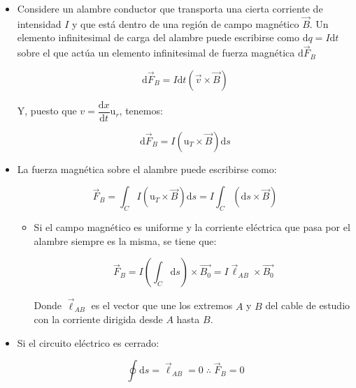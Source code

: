 \documentclass[a4paper,10pt]{article}
\begin{document}
\begin{itemize}
    
\item Considere un alambre conductor que transporta una cierta corriente
de intensidad $I$ y que está dentro de una región de campo magnético
$\vec{B}$. Un elemento infinitesimal de carga del alambre puede escribirse
como $\mathrm{d}q=I\mathrm{d}t$ sobre el que actúa un elemento
infinitesimal de fuerza magnética $\mathrm{d}\vec{F}_B$

\begin{equation*}
    \mathrm{d}\vec{F}_B=I\mathrm{d} t\left(\vec{v}\times\vec{B}\right)
\end{equation*}

Y, puesto que $v=\dfrac{\mathrm{d}x}{\mathrm{d}t}\mathrm{u}_r$, tenemos:

\begin{equation*}
    \mathrm{d}\vec{F}_B=I\left(\mathrm{u}_T\times\vec{B}\right)\mathrm{d}s
\end{equation*}

\item La fuerza magnética sobre el alambre puede escribirse como:

\begin{equation*}
    \boxed{
    \vec{F}_B=\int_C I\left(\mathrm{u}_T\times\vec{B}\right)\mathrm{d}s
    =I\int_C\left(\mathrm{d}s\times\vec{B}\right)
    }
\end{equation*}

    \begin{itemize}
        
    \item Si el campo magnético es uniforme y la corriente eléctrica que
    pasa por el alambre siempre es la misma, se tiene que:

    \begin{equation*}
        \boxed{
        \vec{F}_B=I\left(\int_C\mathrm{d}s\right)\times\vec{B_0}
        =I\vec{\ell}_{AB}\times\vec{B_0}
        }
    \end{equation*}

    Donde $\vec{\ell}_{AB}$ es el vector que une los extremos
    $A$ y $B$ del cable de estudio con la corriente dirigida
    desde $A$ hasta $B$.

    \end{itemize}

\item Si el circuito eléctrico es cerrado:

\begin{equation*}
    \boxed{
    \oint \mathrm{d}s=\vec{\ell}_{AB}=0\;\therefore\;\vec{F}_B=0
    }
\end{equation*}

\end{itemize}
\end{document}
